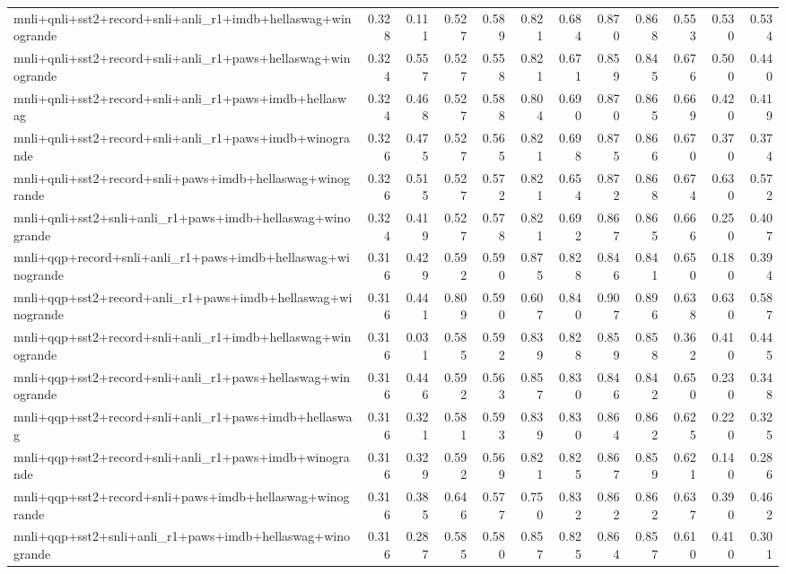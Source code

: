 \begin{table}[t]
\begin{tabular}{lrrrrrrrrrrr}
    mnli+qnli+sst2+record+snli+anli\_r1+imdb+hellaswag+winogrande & 0.328 & 0.111 & 0.527 & 0.589 & 0.821 & 0.684 & 0.870 & 0.868 & 0.553 & 0.530 & 0.534 \\
    mnli+qnli+sst2+record+snli+anli\_r1+paws+hellaswag+winogrande & 0.324 & 0.557 & 0.527 & 0.558 & 0.821 & 0.671 & 0.859 & 0.845 & 0.676 & 0.500 & 0.440 \\
    mnli+qnli+sst2+record+snli+anli\_r1+paws+imdb+hellaswag & 0.324 & 0.468 & 0.527 & 0.588 & 0.804 & 0.690 & 0.870 & 0.865 & 0.669 & 0.420 & 0.419 \\
    mnli+qnli+sst2+record+snli+anli\_r1+paws+imdb+winogrande & 0.326 & 0.475 & 0.527 & 0.565 & 0.821 & 0.698 & 0.875 & 0.866 & 0.670 & 0.370 & 0.374 \\
    mnli+qnli+sst2+record+snli+paws+imdb+hellaswag+winogrande & 0.326 & 0.515 & 0.527 & 0.572 & 0.821 & 0.654 & 0.872 & 0.868 & 0.674 & 0.630 & 0.572 \\
    mnli+qnli+sst2+snli+anli\_r1+paws+imdb+hellaswag+winogrande & 0.324 & 0.419 & 0.527 & 0.578 & 0.821 & 0.692 & 0.867 & 0.865 & 0.666 & 0.250 & 0.407 \\
    mnli+qqp+record+snli+anli\_r1+paws+imdb+hellaswag+winogrande & 0.316 & 0.429 & 0.592 & 0.590 & 0.875 & 0.828 & 0.846 & 0.841 & 0.650 & 0.180 & 0.394 \\
    mnli+qqp+sst2+record+anli\_r1+paws+imdb+hellaswag+winogrande & 0.316 & 0.441 & 0.809 & 0.590 & 0.607 & 0.840 & 0.907 & 0.896 & 0.638 & 0.630 & 0.587 \\
    mnli+qqp+sst2+record+snli+anli\_r1+imdb+hellaswag+winogrande & 0.316 & 0.031 & 0.585 & 0.592 & 0.839 & 0.828 & 0.859 & 0.858 & 0.362 & 0.410 & 0.445 \\
    mnli+qqp+sst2+record+snli+anli\_r1+paws+hellaswag+winogrande & 0.316 & 0.446 & 0.592 & 0.563 & 0.857 & 0.830 & 0.846 & 0.842 & 0.650 & 0.230 & 0.348 \\
    mnli+qqp+sst2+record+snli+anli\_r1+paws+imdb+hellaswag & 0.316 & 0.321 & 0.581 & 0.593 & 0.839 & 0.830 & 0.864 & 0.862 & 0.625 & 0.220 & 0.325 \\
    mnli+qqp+sst2+record+snli+anli\_r1+paws+imdb+winogrande & 0.316 & 0.329 & 0.592 & 0.569 & 0.821 & 0.825 & 0.867 & 0.859 & 0.621 & 0.140 & 0.286 \\
    mnli+qqp+sst2+record+snli+paws+imdb+hellaswag+winogrande & 0.316 & 0.385 & 0.646 & 0.577 & 0.750 & 0.832 & 0.862 & 0.862 & 0.637 & 0.390 & 0.462 \\
    mnli+qqp+sst2+snli+anli\_r1+paws+imdb+hellaswag+winogrande & 0.316 & 0.287 & 0.585 & 0.580 & 0.857 & 0.825 & 0.864 & 0.857 & 0.610 & 0.410 & 0.301 \\

\end{tabular}
\end{table}
